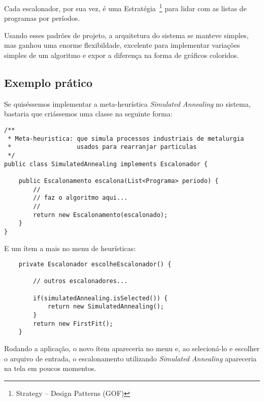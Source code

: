 Cada escalonador, por sua vez, é uma Estratégia~\footnote{Strategy -- Design Patterns (GOF)} para lidar com as listas de programas por períodos.

Usando esses padrões de projeto, a arquitetura do sistema se manteve simples, mas ganhou uma enorme flexibildade, excelente para implementar variações simples de um algoritmo e expor a diferença na forma de gráficos coloridos.

\subsection{Exemplo prático}

Se quiséssemos implementar a meta-heurística \textit{Simulated Annealing} no sistema, bastaria que criássemos uma classe na seguinte forma:

\vspace{1em}

\begin{lstlisting}
/**
 * Meta-heuristica: que simula processos industriais de metalurgia 
 * 					usados para rearranjar particulas
 */
public class SimulatedAnnealing implements Escalonador {

	public Escalonamento escalona(List<Programa> periodo) {
		//
		// faz o algoritmo aqui...
		//
		return new Escalonamento(escalonado);
	}
}
\end{lstlisting}

\vspace{1em}

E um ítem a mais no menu de heurísticas:

\vspace{1em}

\begin{lstlisting}
	private Escalonador escolheEscalonador() {

		// outros escalonadores...

		if(simulatedAnnealing.isSelected()) {
			return new SimulatedAnnealing();
		}
		return new FirstFit();
	}
\end{lstlisting}

Rodando a aplicação, o novo ítem apareceria no menu e, ao selecioná-lo e escolher o arquivo de entrada, o escalonamento utilizando \textit{Simulated Annealing} apareceria na tela em poucos momentos.
